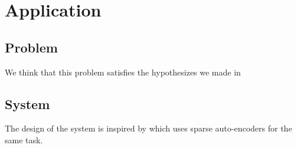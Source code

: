\part{Application} \label{part:application}

\chapter{Problem} \label{chap:problem}
We think that this problem satisfies the hypothesizes we made in 







\chapter{System} \label{chap:system}

The design of the system is inspired by \cite{lecun2011PSDaudio} which uses sparse auto-encoders for the same task.

